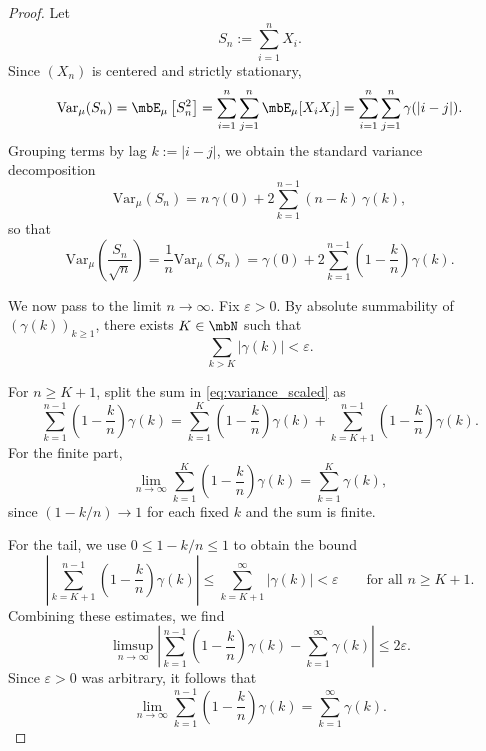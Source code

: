 \documentclass[a4paper]{article}
\numberwithin{equation}{section}   %
\theoremstyle{plain}   %
\theoremstyle{plain}   %
\theoremstyle{examplestyle}
\begin{document}
        \begin{proof}
            Let 
            \[
                S_n:=\sum_{i=1}^n X_i.
            \]
            Since $(X_n)$ is centered and strictly stationary,
            \[
                \mathrm{Var}_\mu(S_n)
                = \mbE_\mu\left[S_n^2\right]
                = \sum_{i=1}^n\sum_{j=1}^n \mbE_\mu[X_i X_j]
                = \sum_{i=1}^n\sum_{j=1}^n \gamma(|i-j|).
            \]
            Grouping terms by lag $k:=|i-j|$, we obtain the standard variance decomposition
            \[
                \mathrm{Var}_\mu(S_n)
                = n\,\gamma(0)
                  + 2\sum_{k=1}^{n-1} (n-k)\,\gamma(k),
            \]
            so that
            \begin{equation}
            \label{eq:variance_scaled}
                \mathrm{Var}_\mu\!\left(\frac{S_n}{\sqrt{n}}\right)
                = \frac{1}{n}\mathrm{Var}_\mu(S_n)
                = \gamma(0)
                  + 2\sum_{k=1}^{n-1} \left(1 - \frac{k}{n}\right)\gamma(k).
            \end{equation}
            
            We now pass to the limit $n\to\infty$.
            Fix $\varepsilon>0$. By absolute summability of $(\gamma(k))_{k\ge1}$, there exists $K\in\mbN$ such that
            \[
                \sum_{k>K} |\gamma(k)| < \varepsilon.
            \]

            For $n\ge K+1$, split the sum in \eqref{eq:variance_scaled} as
            \[
                \sum_{k=1}^{n-1} \left(1 - \frac{k}{n}\right)\gamma(k)
                =
                \sum_{k=1}^{K} \left(1 - \frac{k}{n}\right)\gamma(k)
                +
                \sum_{k=K+1}^{n-1} \left(1 - \frac{k}{n}\right)\gamma(k).
            \]
            For the finite part,
            \[
                \lim_{n\to\infty}\sum_{k=1}^{K} \left(1 - \frac{k}{n}\right)\gamma(k)
                = \sum_{k=1}^{K} \gamma(k),
            \]
            since $(1-k/n)\to1$ for each fixed $k$ and the sum is finite.
            
            For the tail, we use $0\le 1 - k/n \le 1$ to obtain the bound
            \[
                \left|
                   \sum_{k=K+1}^{n-1} \left(1 - \frac{k}{n}\right)\gamma(k)
                \right|
                \le
                \sum_{k=K+1}^{\infty} |\gamma(k)|
                < \varepsilon
                \qquad\text{for all }n\ge K+1.
            \]
            Combining these estimates, we find
            \[
                \limsup_{n\to\infty}
                \left|
                   \sum_{k=1}^{n-1} \left(1 - \frac{k}{n}\right)\gamma(k)
                   - \sum_{k=1}^\infty \gamma(k)
                \right|
                \le 2\varepsilon.
            \]
            Since $\varepsilon>0$ was arbitrary, it follows that
            \[
                \lim_{n\to\infty}
                \sum_{k=1}^{n-1} \left(1 - \frac{k}{n}\right)\gamma(k)
                = \sum_{k=1}^\infty \gamma(k).
            \]
            

\end{proof}
\end{document}
